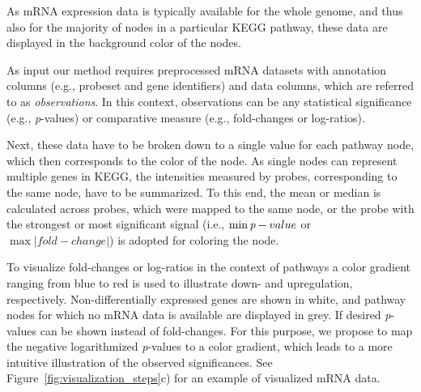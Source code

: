 \documentclass{bioinfo}
\begin{document}
As mRNA expression data is typically available for the whole genome, and thus also for the majority
of nodes in a particular KEGG pathway, these data are displayed in the background color of the
nodes.

As input our method requires preprocessed mRNA datasets with annotation columns (e.g., probeset and
gene identifiers) and data columns, which are referred to as \emph{observations}. In this context,
observations can be any statistical significance (e.g., \emph{p}-values) or comparative measure
(e.g., fold-changes or log-ratios).

Next, these data have to be broken down to a single value for each pathway node, which then
corresponds to the color of the node.  As single nodes can represent multiple genes in KEGG, the
intensities measured by probes, corresponding to the same node, have to be summarized. To this end,
the mean or median is calculated across probes, which were mapped to the same node, or the probe
with the strongest or most significant signal (i.e., $\min\emph{p}-value$ or $\max|fold-change|$) is
adopted for coloring the node.

To visualize fold-changes or log-ratios in the context of pathways a color gradient ranging from
blue to red is used to illustrate down- and upregulation, respectively. Non-differentially expressed
genes are shown in white, and pathway nodes for which no mRNA data is available are displayed in
grey. If desired \emph{p}-values can be shown instead of fold-changes. For this purpose, we propose
to map the negative logarithmized \emph{p}-values to a color gradient, which leads to a more
intuitive illustration of the observed significances.  See Figure~\ref{fig:visualization_steps}c)
for an example of visualized mRNA data.

\end{document}
